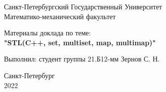 
    \pagestyle{empty}
    \begin{center}
        \LARGE
            {
                Санкт-Петербургский Государственный Университет \\ Математико-механический факультет
            }
    \end{center}
    \vspace*{45mm}
    
    \begin{center}
        \Large
            {
                Материалы доклада по теме: \\
                {\bf
                    "STL(C++, set, multiset, map, multimap)" \\
                }
            }
    \end{center}
    
    \vspace*{35mm}
    
    \Large
        {
            \noindent
            Выполнил: \hfill студент группы 21.Б12-мм Зернов С. Н. \\
        }
        
    \vspace*{81mm}
    
    \begin{center}
        Санкт-Петербург \\ 2022
    \end{center}
